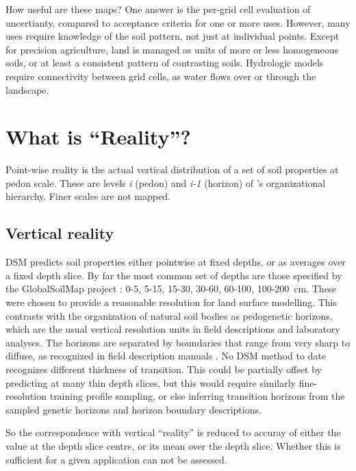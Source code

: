 \documentclass[soil, manuscript]{copernicus}
\begin{document}
\par
How useful are these maps? One answer is the per-grid cell evaluation of uncertianty, compared to acceptance criteria for one or more uses.
%
However, many uses require knowledge of the soil pattern, not just at individual points.
%
Except for precision agriculture, land is managed as units of more or less homogeneous soils, or at least a consistent pattern of contrasting soils.
%
Hydrologic models require connectivity between grid cells, as water flows over or through the landscape.

\section{What is ``Reality''?}

\par
Point-wise reality is the actual vertical distribution of a set of soil properties at pedon scale.
%
These are levels \textit{i} (pedon) and \textit{i-1} (horizon) of \citet{Hoosbeekquantitativemodelingpedogenesis1992}'s organizational hierarchy.
%
Finer scales are not mapped.

\subsection{Vertical reality}

DSM predicts soil properties either pointwise at fixed depths, or as averages over a fixed depth slice.
%
By far the most common set of depths are those specified by the GlobalSoilMap project \citep{ScienceCommittee2015a}: 0-5, 5-15, 15-30, 30-60, 60-100, 100-200~cm.
%
These were chosen to provide a reasonable resolution for land surface modelling.
%
This contrasts with the organization of natural soil bodies as pedogenetic horizons, which are the usual vertical resolution units in field descriptions and laboratory analyses.
%
The horizons are separated by boundaries that range from very sharp to diffuse, as recognized in field description manuals \citep{usdanaturalresourcesconservationservice.FieldBookDescribing2024, foodandagricultureorganizationoftheunitednationsGuidelinesSoilDescription2006}.
%
No DSM method to date recognizes different thickness of transition.
%
This could be partially offset by predicting at many thin depth slices, but this would require similarly fine-resolution training profile sampling, or else inferring transition horizons from the sampled genetic horizons and horizon boundary descriptions.

\par
So the correspondence with vertical ``reality'' is reduced to accuray of either the value at the depth slice centre, or its mean over the depth slice.
%
Whether this is sufficient for a given application can not be assessed.
\end{document}

